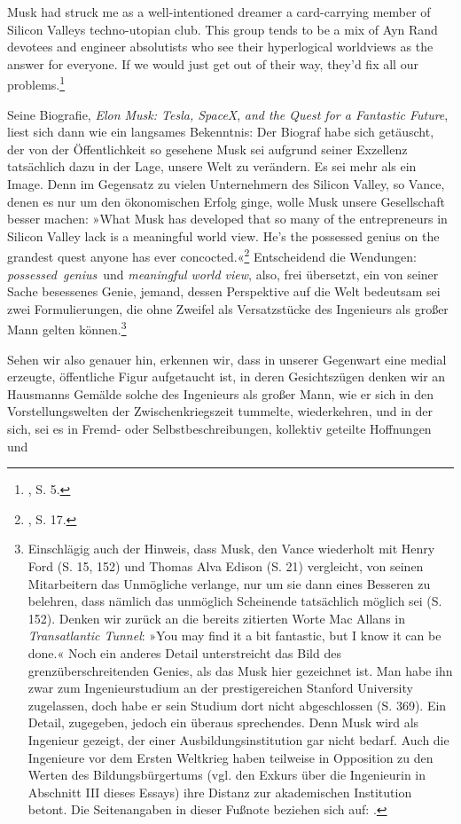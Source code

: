 \documentclass[%
	fontsize=10pt,%
	twoside,%
	headings=optiontoheadandtoc,%
	showtrims]{scrbook}
\renewenvironment{quote}{%
  \addmargin[\genericindent]{0pt}%
  \KOMAoptions{parskip=true}%
  \ifdim\parskip>0pt\else\addvspace{\intextsep}\fi
}{%
  \par
  \endaddmargin\vspace{\intextsep}
}
\begin{document}
\begin{quote}
\par Musk had struck me as a well-intentioned dreamer \textendash{} a card-carrying member of Silicon Valleys techno-utopian club. This group tends to be a mix of Ayn Rand devotees and engineer absolutists who see their hyperlogical worldviews as the an\-swer for everyone. If we would just get out of their way, they\textquoteright{}d fix all our problems.\footnote{\cite[][]{vance2015a}, S. 5.} 
\end{quote}
\par Seine Biografie, \emph{Elon Musk: Tesla, SpaceX}, \emph{and the Quest for a Fantastic Future}, liest sich dann wie ein langsames Bekenntnis: Der Biograf habe sich getäuscht, der von der Öffentlichkeit so gesehene Musk sei aufgrund seiner Exzellenz tatsächlich dazu in der Lage, unsere Welt zu verändern. Es sei mehr als ein Image. Denn im Gegensatz zu vielen Unternehmern des Silicon Valley, so Vance, denen es nur um den ökonomischen Erfolg ginge, wolle Musk unsere Gesellschaft besser machen: »What Musk has developed that so many of the entrepreneurs in Silicon Valley lack is a meaningful world view. He\textquoteright{}s the possessed genius on the grandest quest anyone has ever concocted.«\footnote{\cite[][]{vance2015a}, S. 17.}  Entscheidend die Wendungen: \emph{possessed~genius}~und \emph{meaningful world view}, also, frei übersetzt, ein von seiner Sache besessenes Genie, jemand, dessen Perspektive auf die Welt bedeutsam sei \textendash{} zwei Formulierungen, die ohne Zweifel als Versatzstücke des Ingenieurs als großer Mann gelten können.\footnote{Einschlägig auch der Hinweis, dass Musk, den Vance wiederholt mit Henry Ford (S. 15, 152) und Thomas Alva Edison (S. 21) vergleicht, von seinen Mitarbeitern das Unmögliche verlange, nur um sie dann eines Besseren zu belehren, dass nämlich das unmöglich Scheinende tatsächlich möglich sei (S. 152). Denken wir zurück an die bereits zitierten Worte Mac Allans in \emph{Transatlantic Tunnel}: »You may find it a bit fantastic, but I know it can be done.« Noch ein anderes Detail unterstreicht das Bild des grenzüberschreitenden Genies, als das Musk hier gezeichnet ist. Man habe ihn zwar zum Ingenieurstudium an der prestigereichen Stanford University zugelassen, doch habe er sein Studium dort nicht abgeschlossen (S. 369). Ein Detail, zugegeben, jedoch ein überaus sprechendes. Denn Musk wird als Ingenieur gezeigt, der einer Ausbildungsinstitution gar nicht bedarf. Auch die Ingenieure vor dem Ersten Weltkrieg haben teilweise in Opposition zu den Werten des Bildungsbürgertums (vgl. den Exkurs über die Ingenieurin in Abschnitt III dieses Essays) ihre Distanz zur akademischen Institution betont. Die Seitenangaben in dieser Fußnote beziehen sich auf: \cite[][]{vance2015a}.} \par Sehen wir also genauer hin, erkennen wir, dass in unserer Gegenwart eine medial erzeugte, öffentliche Figur aufgetaucht ist, in deren Gesichtszügen \textendash{} denken wir an Hausmanns Gemälde \textendash{} solche des Ingenieurs als großer Mann, wie er sich in den Vorstellungswelten der Zwischenkriegszeit tummelte, wiederkehren, und in der sich, sei es in Fremd- oder Selbstbeschreibungen, kollektiv geteilte Hoffnungen und 
\end{document}
